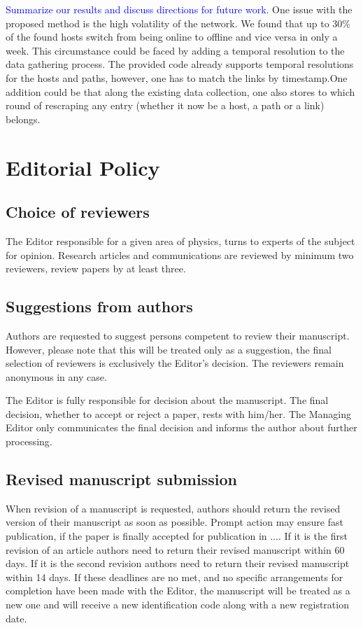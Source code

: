 \documentclass[USenglish,oneside,twocolumn]{article}
\newcommand\CONTENT[1]{\textcolor{blue}{#1}}
\begin{document}
\CONTENT{Summarize our results and discuss directions for future work.}
One issue with the proposed method is the high volatility of the network. We found that up to 30\% of the found hosts switch from being online to offline and vice versa in only a week. This circumstance could be faced by adding a temporal resolution to the data gathering process.
The provided code already supports temporal resolutions for the hosts and paths, however, one has to match the links by timestamp.One addition could be that along the existing data collection, one also stores to which round of rescraping any entry (whether it now be a host, a path or a link) belongs.

\section{Editorial Policy}

\subsection{Choice of reviewers}

The Editor responsible for a given area of physics, turns to experts of the subject for opinion. Research articles and communications are reviewed by minimum two reviewers, review papers by at least three.

\subsection{Suggestions from authors}

Authors are requested to suggest persons competent to review their manuscript. However, please note that this will be treated only as a suggestion, the final selection of reviewers is exclusively the Editor's decision. The reviewers remain anonymous in any case.

The Editor is fully responsible for decision about the manuscript. The final decision, whether to accept or reject a paper, rests with him/her. The Managing Editor only communicates the final decision and informs the author about further processing.

\subsection{Revised manuscript submission}

When revision of a manuscript is requested, authors should return the revised version of their manuscript as soon as possible. Prompt action may ensure fast publication, if the paper is finally accepted for publication in .... If it is the first revision of an article authors need to return their revised manuscript within 60 days. If it is the second revision authors need to return their revised manuscript within 14 days. If these deadlines are no met, and no specific arrangements for completion have been made with the Editor, the manuscript will be treated as a new one and will receive a new identification code along with a new registration date.
\end{document}
